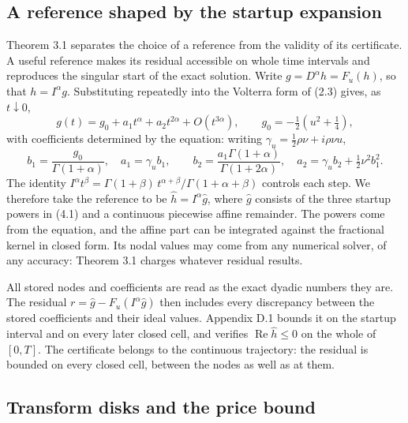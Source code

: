\documentclass[11pt,a4paper]{article}
\begin{document}
\setcounter{subsection}{0}\subsection{A reference shaped by the startup expansion}

Theorem 3.1 separates the choice of a reference from the validity of its certificate. A useful reference makes its residual accessible on whole time intervals and reproduces the singular start of the exact solution. Write \(g=D^\alpha h=F_u(h)\), so that \(h=I^\alpha g\). Substituting repeatedly into the Volterra form of (2.3) gives, as \(t\downarrow0\),
\begin{equation*}\tag{4.1}
g(t)=g_0+a_1t^\alpha+a_2t^{2\alpha}+O(t^{3\alpha}),\qquad g_0=-\tfrac12\left(u^2+\tfrac14\right),
\end{equation*}
with coefficients determined by the equation: writing \(\gamma_u=\tfrac12\rho\nu+i\rho\nu u\),
\begin{equation*}\tag{4.2}
b_1=\frac{g_0}{\Gamma(1+\alpha)},\quad a_1=\gamma_ub_1,\qquad
b_2=\frac{a_1\Gamma(1+\alpha)}{\Gamma(1+2\alpha)},\quad a_2=\gamma_ub_2+\tfrac12\nu^2b_1^2 .
\end{equation*}
The identity \(I^\alpha t^\beta=\Gamma(1+\beta)\,t^{\alpha+\beta}/\Gamma(1+\alpha+\beta)\) controls each step. We therefore take the reference to be \(\widehat h=I^\alpha\widehat g\), where \(\widehat g\) consists of the three startup powers in (4.1) and a continuous piecewise affine remainder. The powers come from the equation, and the affine part can be integrated against the fractional kernel in closed form. Its nodal values may come from any numerical solver, of any accuracy: Theorem 3.1 charges whatever residual results.

All stored nodes and coefficients are read as the exact dyadic numbers they are. The residual \(r=\widehat g-F_u(I^\alpha\widehat g)\) then includes every discrepancy between the stored coefficients and their ideal values. Appendix D.1 bounds it on the startup interval and on every later closed cell, and verifies \(\operatorname{Re}\widehat h\le0\) on the whole of \([0,T]\). The certificate belongs to the continuous trajectory: the residual is bounded on every closed cell, between the nodes as well as at them.

\setcounter{subsection}{1}\subsection{Transform disks and the price bound}
\end{document}
